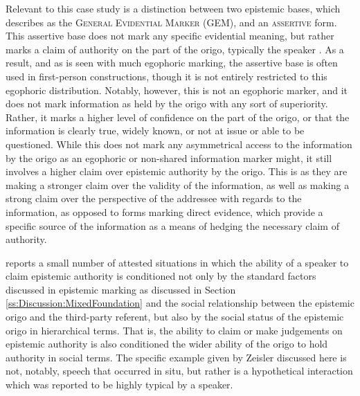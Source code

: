 Relevant to this case study is a distinction between two epistemic bases, which  describes as the \textsc{General Evidential Marker} (GEM), and an \textsc{assertive} form. This assertive base does not mark any specific evidential meaning, but rather marks a claim of authority on the part of the origo, typically the speaker \cite{Zeisler2018a}. As a result, and as is seen with much egophoric marking, the assertive base is often used in first-person constructions, though it is not entirely restricted to this egophoric distribution. Notably, however, this is not an egophoric marker, and it does not mark information as held by the origo with any sort of superiority. Rather, it marks a higher level of confidence on the part of the origo, or that the information is clearly true, widely known, or not at issue or able to be questioned. While this does not mark any asymmetrical access to the information by the origo as an egophoric or non-shared information marker might, it still involves a higher claim over epistemic authority by the origo. This is as they are making a stronger claim over the validity of the information, as well as making a strong claim over the perspective of the addressee with regards to the information, as opposed to forms marking direct evidence, which provide a specific source of the information as a means of hedging the necessary claim of authority.

 reports a small number of attested situations in which the ability of a speaker to claim epistemic authority is conditioned not only by the standard factors discussed in epistemic marking as discussed in Section \ref{ss:Discussion:MixedFoundation} and the social relationship between the epistemic origo and the third-party referent, but also by the social status of the epistemic origo in hierarchical terms. That is, the ability to claim or make judgements on epistemic authority is also conditioned the wider ability of the origo to hold authority in social terms. The specific example given by Zeisler discussed here is not, notably, speech that occurred in situ, but rather is a hypothetical interaction which was reported to be highly typical by a speaker.

